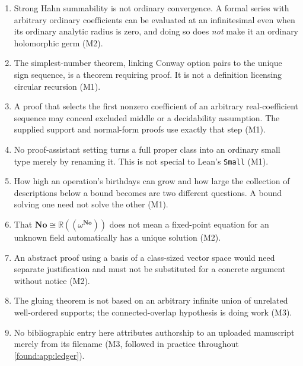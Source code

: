 \documentclass[11pt,letterpaper]{article}
\numberwithin{equation}{section}
\theoremstyle{definition}
\theoremstyle{remark}
\newcommand{\No}{\mathbf{No}}
\newcommand{\R}{\mathbb R}
\begin{document}
\begin{enumerate}[resume]
\item Strong Hahn summability is not ordinary convergence. A formal series with
arbitrary ordinary coefficients can be evaluated at an infinitesimal even when
its ordinary analytic radius is zero, and doing so does \emph{not} make it an
ordinary holomorphic germ (M2).
\item The simplest-number theorem, linking Conway option pairs to the unique
sign sequence, is a theorem requiring proof. It is not a definition licensing
circular recursion (M1).
\item A proof that selects the first nonzero coefficient of an arbitrary
real-coefficient sequence may conceal excluded middle or a decidability
assumption. The supplied support and normal-form proofs use exactly that step
(M1).
\item No proof-assistant setting turns a full proper class into an ordinary
small type merely by renaming it. This is not special to Lean's \texttt{Small}
(M1).
\item How high an operation's birthdays can grow and how large the collection
of descriptions below a bound becomes are two different questions. A bound
solving one need not solve the other (M1).
\item That $\No\cong\R((\omega^{\No}))$ does not mean a fixed-point equation
for an unknown field automatically has a unique solution (M2).
\item An abstract proof using a basis of a class-sized vector space would need
separate justification and must not be substituted for a concrete argument
without notice (M2).
\item The gluing theorem is not based on an arbitrary infinite union of
unrelated well-ordered supports; the connected-overlap hypothesis is doing work
(M3).
\item No bibliographic entry here attributes authorship to an uploaded
manuscript merely from its filename (M3, followed in practice throughout
\cref{found:app:ledger}).
\end{enumerate}
\end{document}
